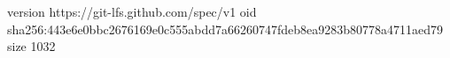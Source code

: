 version https://git-lfs.github.com/spec/v1
oid sha256:443e6e0bbc2676169e0c555abdd7a66260747fdeb8ea9283b80778a4711aed79
size 1032
